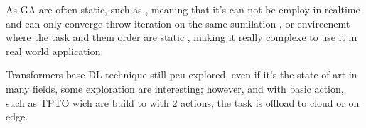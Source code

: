 As GA are often static, such as \cite{bernard_d-npga_2024, pakmehr_etfc_2024}, meaning that it's can not be employ in realtime and can only converge throw iteration on the same sumilation , or envireenemt where the task and them order are static , making it really complexe to use it in real world application.

Transformers base DL technique still peu explored, even if it's the state of art in many fields, some exploration are interesting;  however,  and with basic action, such as TPTO \cite{gholipour_tpto_2023} wich are build to with 2 actions, the task is offload to cloud or on edge.